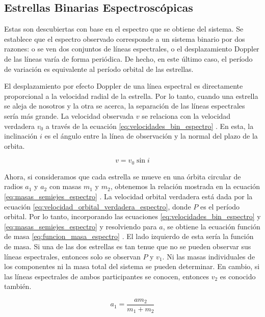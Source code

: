 \documentclass[12pt,letterpaper,oneside]{book}
\begin{document}
\subsection{Estrellas Binarias Espectroscópicas}
Estas son descubiertas con base en el espectro que se obtiene del sistema. Se establece que el espectro observado corresponde a un sistema binario por dos razones: o se ven dos conjuntos de líneas espectrales, o el desplazamiento Doppler de las líneas varía de forma periódica. De hecho, en este último caso, el período de variación es equivalente al período orbital de las estrellas.

El desplazamiento por efecto Doppler de una línea espectral es directamente proporcional a la velocidad radial de la estrella. Por lo tanto, cuando una estrella se aleja de nosotros y la otra se acerca, la separación de las líneas espectrales sería más grande. La velocidad observada $v$ se relaciona con la velocidad verdadera $v_0$ a través de la ecuación \ref{eq:velocidades_bin_espectro} \cite{Karttunen2016}. En esta, la inclinación $i$ es el ángulo entre la línea de observación y la normal del plazo de la orbita.

\begin{equation}
    v=v_0 \sin{i}
    \label{eq:velocidades_bin_espectro}
\end{equation}

Ahora, si consideramos que cada estrella se mueve en una órbita circular de radios $a_1$ y $a_2$ con masas $m_1$ y $m_2$, obtenemos la relación mostrada en la ecuación \ref{eq:masas_semiejes_espectro} \cite{Karttunen2016}. La velocidad orbital verdadera está dada por la ecuación \ref{eq:velocidad_orbital_verdadera_espectro}, donde $P$ es el período orbital. Por lo tanto, incorporando las ecuaciones \ref{eq:velocidades_bin_espectro} y \ref{eq:masas_semiejes_espectro} y resolviendo para $a$, se obtiene la ecuación función de masa \ref{eq:funcion_masa_espectro} \cite{Karttunen2016}. El lado izquierdo de esta sería la función de masa. Si una de las dos estrellas es tan tenue que no se pueden observar sus líneas espectrales, entonces solo se observan $P$ y $v_1$. Ni las masas individuales de los componentes ni la masa total del sistema se pueden determinar. En cambio, si las líneas espectrales de ambos participantes se conocen, entonces $v_2$ es conocido también.
 
\begin{equation}
    a_1=\frac{am_2}{m_1+m_2}
    \label{eq:masas_semiejes_espectro}
\end{equation}
\end{document}
